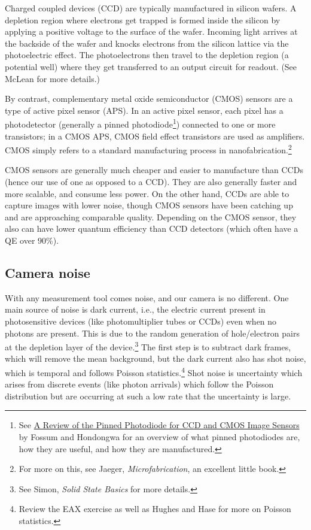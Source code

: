 \documentclass{../lab}
\begin{document}

Charged coupled devices (CCD) are typically manufactured in silicon wafers. A depletion region where electrons get trapped is formed inside the silicon by applying a positive voltage to the surface of the wafer. Incoming light arrives at the backside of the wafer and knocks electrons from the silicon lattice via the photoelectric effect. The photoelectrons then travel to the depletion region (a potential well) where they get transferred to an output circuit for readout. (See McLean for more details.) %


By contrast, complementary metal oxide semiconductor (CMOS) sensors are a type of active pixel sensor (APS). In an active pixel sensor, each pixel has a photodetector (generally a pinned photodiode\footnote{See \href{https://ieeexplore.ieee.org/stamp/stamp.jsp?tp=&arnumber=6742594}{A Review of the Pinned Photodiode for CCD and CMOS Image Sensors} by Fossum and Hondongwa for an overview of what pinned photodiodes are, how they are useful, and how they are manufactured.}) connected to one or more transistors; in a CMOS APS, CMOS field effect transistors are used as amplifiers. CMOS simply refers to a standard manufacturing process in nanofabrication.\footnote{For more on this, see Jaeger, \textit{Microfabrication}, an excellent little book.}

CMOS sensors are generally much cheaper and easier to manufacture than CCDs (hence our use of one as opposed to a CCD). They are also generally faster and more scalable, and consume less power. On the other hand, CCDs are able to capture images with lower noise, though CMOS sensors have been catching up and are approaching comparable quality. Depending on the CMOS sensor, they also can have lower quantum efficiency than CCD detectors (which often have a QE over 90\%).

\subsection{Camera noise}

With any measurement tool comes noise, and our camera is no different. One main source of noise is dark current, i.e., the electric current present in photosensitive devices (like photomultiplier tubes or CCDs) even when no photons are present. This is due to the random generation of hole/electron pairs at the depletion layer of the device.\footnote{See Simon, \textit{Solid State Basics} for more details.} The first step is to subtract dark frames, which will remove the mean background, but the dark current also has shot noise, which is temporal and follows Poisson statistics.\footnote{Review the EAX exercise as well as Hughes and Hase for more on Poisson statistics.} Shot noise is uncertainty which arises from discrete events (like photon arrivals) which follow the Poisson distribution but are occurring at such a low rate that the uncertainty is large.
\end{document}
